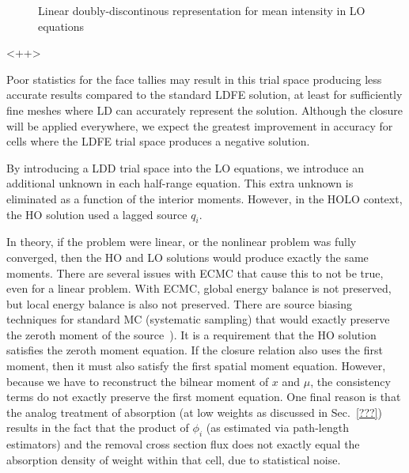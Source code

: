 \begin{figure}[<+htpb+>]
    \centering
    \begin{center}
    \end{center}
    \caption{Linear doubly-discontinous representation for mean intensity in LO equations}
    \label{fig:ldd_space}
\end{figure}<++>


    Poor statistics for the face tallies may result in this trial space producing less
accurate results compared to the standard LDFE solution, at least for sufficiently fine meshes where LD
can accurately represent the solution.  Although the closure will be applied everywhere,
we expect the greatest improvement in accuracy for cells where the LDFE trial space
produces a negative solution.

By introducing a LDD trial space into the LO equations, we introduce an additional
unknown in each half-range equation.  This extra unknown is eliminated as a function
of the interior moments.  
However, in the HOLO context, the HO solution used a lagged source $q_i$.

In theory, if the problem were linear, or the nonlinear problem was fully converged,
then the HO and LO solutions would produce exactly the same moments.  There are
several issues with ECMC that cause this to not be true, even for a linear problem.
With ECMC, global energy balance is not preserved, but local energy balance is also
not preserved.  There are source biasing techniques for standard MC (systematic
sampling) that would exactly preserve the zeroth moment of the source~\cite{shultis_mc}). 
It is a requirement that the HO solution satisfies the zeroth moment equation. If the
closure relation also uses the first moment, then it must also satisfy the first
spatial moment equation.  However, because we have to reconstruct the bilnear moment
of $x$ and $\mu$, the consistency terms do not exactly preserve the first moment
equation.  One final reason is that the analog treatment of absorption (at low
weights as discussed in Sec.~\ref{???}) results in the fact that the product of
$\phi_i$ (as estimated via path-length estimators) and the removal cross section 
flux does not exactly equal the absorption density of weight within that cell, due to
statistical noise.  
